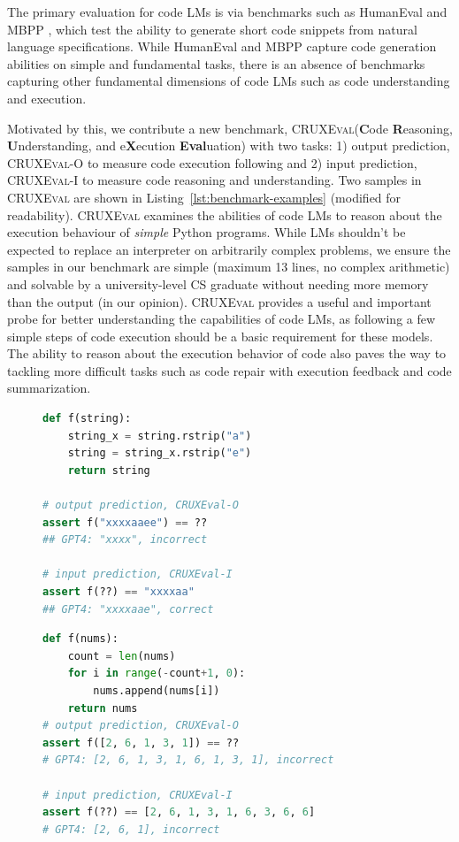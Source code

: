 \documentclass{article} %
\newcommand{\benchmark}{\textsc{CRUXEval}\xspace}
\newcommand{\benchmarki}{\textsc{CRUXEval-I}\xspace}
\newcommand{\benchmarko}{\textsc{CRUXEval-O}\xspace}
\begin{document}
The primary evaluation for code LMs is via benchmarks such as HumanEval \citep{chen2021evaluating} and MBPP \citep{austin2021program}, which test the ability to generate short code snippets from natural language specifications. While HumanEval and MBPP capture code generation abilities on simple and fundamental tasks, there is an absence of benchmarks capturing other fundamental dimensions of code LMs such as code understanding and execution.

Motivated by this, we contribute a new benchmark, \benchmark (\textbf{C}ode \textbf{R}easoning, \textbf{U}nderstanding, and e\textbf{X}ecution \textbf{Eval}uation) with two tasks: 1) output prediction, \benchmarko to measure code execution following and 2) input prediction, \benchmarki to measure code reasoning and understanding. Two samples in \benchmark are shown in Listing~\ref{lst:benchmark-examples} (modified for readability). \benchmark examines the abilities of code LMs to reason about the execution behaviour of \textit{simple} Python programs. While LMs shouldn't be expected to replace an interpreter on arbitrarily complex problems, we ensure the samples in our benchmark are simple (maximum 13 lines, no complex arithmetic) and solvable by a university-level CS graduate without needing more memory than the output (in our opinion). \benchmark provides a useful and important probe for better understanding the capabilities of code LMs, as following a few simple steps of code execution should be a basic requirement for these models. The ability to reason about the execution behavior of code also paves the way to tackling more difficult tasks such as code repair with execution feedback and code summarization.


\begin{figure}[H]
\vspace{-1.5em}
\begin{lstlisting}[caption={},label={lst:benchmark-example1}, captionpos=t, breaklines=true, language=Python]
def f(string):
    string_x = string.rstrip("a")
    string = string_x.rstrip("e")
    return string

# output prediction, CRUXEval-O
assert f("xxxxaaee") == ??
## GPT4: "xxxx", incorrect

# input prediction, CRUXEval-I
assert f(??) == "xxxxaa"
## GPT4: "xxxxaae", correct
\end{lstlisting}

\begin{lstlisting}[caption={Sample problems},label={lst:benchmark-examples}, captionpos=b, breaklines=true, language=python]
def f(nums):
    count = len(nums)
    for i in range(-count+1, 0):
        nums.append(nums[i])
    return nums
# output prediction, CRUXEval-O
assert f([2, 6, 1, 3, 1]) == ??
# GPT4: [2, 6, 1, 3, 1, 6, 1, 3, 1], incorrect

# input prediction, CRUXEval-I
assert f(??) == [2, 6, 1, 3, 1, 6, 3, 6, 6]
# GPT4: [2, 6, 1], incorrect
\end{lstlisting}
\vspace{-.75em}
\end{figure}
\end{document}
